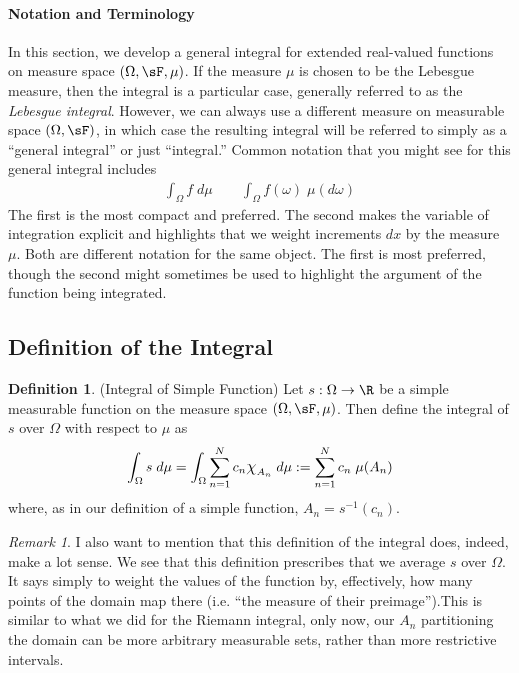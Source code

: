 \documentclass[12pt]{article}
\theoremstyle{plain}
\theoremstyle{definition}
\newtheorem{defn}[thm]{Definition}
\theoremstyle{remark}
\newtheorem*{rmk}{Remark}
\newcommand*{\Chi}{\mbox{\large$\chi$}} %
\newcommand{\ra}{\rightarrow}
\newcommand{\sumnN}{\sum^N_{n=1}}
\begin{document}
\paragraph{Notation and Terminology}
In this section, we develop a general integral for extended real-valued
functions on measure space $(\Omega,\sF,\mu)$. If the measure $\mu$ is
chosen to be the Lebesgue measure, then the integral is a particular
case, generally referred to as the \emph{Lebesgue integral}. However, we
can always use a different measure on measurable space $(\Omega,\sF)$,
in which case the resulting integral will be referred to simply as a
``general integral'' or just ``integral.'' Common notation that you
might see for this general integral includes
\begin{align*}
  \int_\Omega f \; d\mu
  \qquad
  \int_\Omega f(\omega) \; \mu(d\omega)
\end{align*}
The first is the most compact and preferred. The second makes the
variable of integration explicit and highlights that we weight
increments $dx$ by the measure $\mu$. Both are different notation for
the same object. The first is most preferred, though the second might
sometimes be used to highlight the argument of the function being
integrated.

\clearpage
\subsection{Definition of the Integral}

\begin{defn}(Integral of Simple Function)
\label{simpleint}
Let $s:\Omega\ra\R$ be a simple measurable function on the measure space
$(\Omega,\sF,\mu)$. Then define the integral of $s$ over $\Omega$ with
respect to $\mu$ as
\begin{equation}
    \int_\Omega s \; d\mu
    =
    \int_\Omega \sumnN c_n \Chi_{A_n} \; d\mu
    := \sumnN c_n \; \mu(A_n)
\end{equation}
where, as in our definition of a simple function,  $A_n = s^{-1}(c_n)$.
\end{defn}
\begin{rmk}
I also want to mention that this definition of the integral does,
indeed, make a lot sense. We see that this definition prescribes that we
average $s$ over $\Omega$.  It says simply to weight the values of the
function by, effectively, how many points of the domain map there (i.e.
``the measure of their preimage'').This is similar to what we did for
the Riemann integral, only now, our $A_n$ partitioning the domain can be
more arbitrary measurable sets, rather than more restrictive intervals.
\end{rmk}
\end{document}
